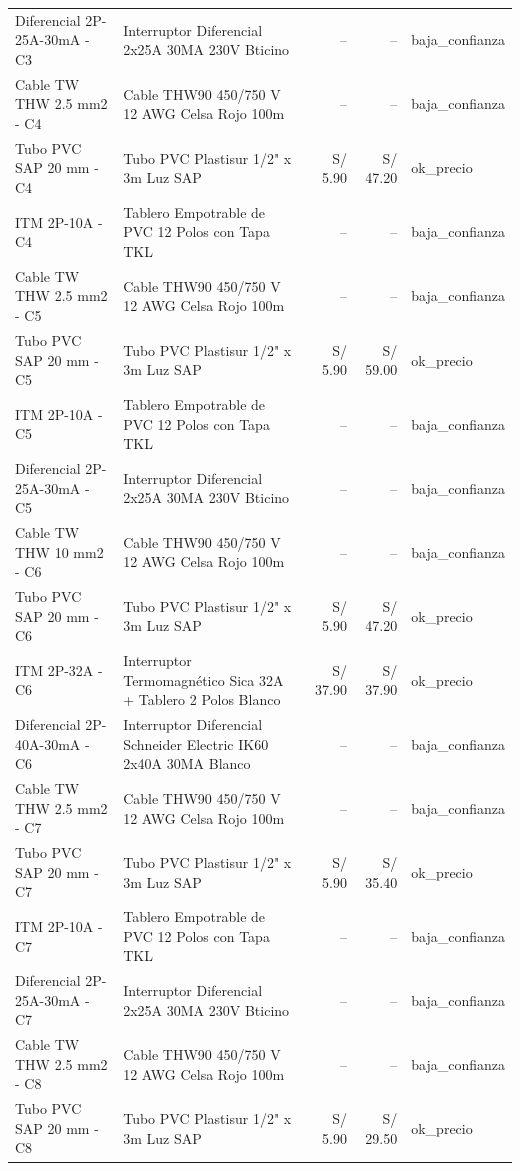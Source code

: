 \documentclass[11pt,a4paper]{article}
\begin{document}
\begin{longtable}{p{} p{} r r p{}}
Diferencial 2P-25A-30mA - C3 & Interruptor Diferencial 2x25A 30MA 230V Bticino & -- & -- & baja\_confianza \\
Cable TW THW 2.5 mm2 - C4 & Cable THW90 450/750 V 12 AWG Celsa Rojo 100m & -- & -- & baja\_confianza \\
Tubo PVC SAP 20 mm - C4 & Tubo PVC Plastisur 1/2" x 3m Luz SAP & S/ 5.90 & S/ 47.20 & ok\_precio \\
ITM 2P-10A - C4 & Tablero Empotrable de PVC 12 Polos con Tapa TKL & -- & -- & baja\_confianza \\
Cable TW THW 2.5 mm2 - C5 & Cable THW90 450/750 V 12 AWG Celsa Rojo 100m & -- & -- & baja\_confianza \\
Tubo PVC SAP 20 mm - C5 & Tubo PVC Plastisur 1/2" x 3m Luz SAP & S/ 5.90 & S/ 59.00 & ok\_precio \\
ITM 2P-10A - C5 & Tablero Empotrable de PVC 12 Polos con Tapa TKL & -- & -- & baja\_confianza \\
Diferencial 2P-25A-30mA - C5 & Interruptor Diferencial 2x25A 30MA 230V Bticino & -- & -- & baja\_confianza \\
Cable TW THW 10 mm2 - C6 & Cable THW90 450/750 V 12 AWG Celsa Rojo 100m & -- & -- & baja\_confianza \\
Tubo PVC SAP 20 mm - C6 & Tubo PVC Plastisur 1/2" x 3m Luz SAP & S/ 5.90 & S/ 47.20 & ok\_precio \\
ITM 2P-32A - C6 & Interruptor Termomagnético Sica 32A + Tablero 2 Polos Blanco & S/ 37.90 & S/ 37.90 & ok\_precio \\
Diferencial 2P-40A-30mA - C6 & Interruptor Diferencial Schneider Electric IK60 2x40A 30MA Blanco & -- & -- & baja\_confianza \\
Cable TW THW 2.5 mm2 - C7 & Cable THW90 450/750 V 12 AWG Celsa Rojo 100m & -- & -- & baja\_confianza \\
Tubo PVC SAP 20 mm - C7 & Tubo PVC Plastisur 1/2" x 3m Luz SAP & S/ 5.90 & S/ 35.40 & ok\_precio \\
ITM 2P-10A - C7 & Tablero Empotrable de PVC 12 Polos con Tapa TKL & -- & -- & baja\_confianza \\
Diferencial 2P-25A-30mA - C7 & Interruptor Diferencial 2x25A 30MA 230V Bticino & -- & -- & baja\_confianza \\
Cable TW THW 2.5 mm2 - C8 & Cable THW90 450/750 V 12 AWG Celsa Rojo 100m & -- & -- & baja\_confianza \\
Tubo PVC SAP 20 mm - C8 & Tubo PVC Plastisur 1/2" x 3m Luz SAP & S/ 5.90 & S/ 29.50 & ok\_precio \\

\end{longtable}
\end{document}
